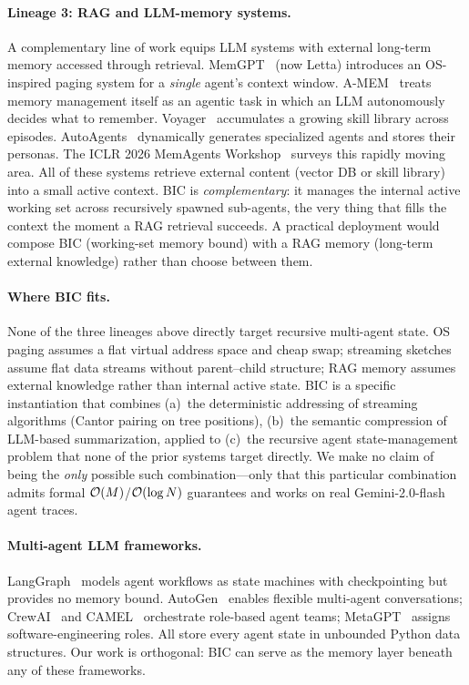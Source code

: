 \paragraph{Lineage 3: RAG and LLM-memory systems.}
A complementary line of work equips LLM systems with external
long-term memory accessed through retrieval.
MemGPT~\citep{packer2023memgpt} (now Letta) introduces an
OS-inspired paging system for a \emph{single} agent's context window.
A-MEM~\citep{amem2025} treats memory management itself as an agentic
task in which an LLM autonomously decides what to remember.
Voyager~\citep{wang2024voyager} accumulates a growing skill library
across episodes.  AutoAgents~\citep{wang2024autoagents} dynamically
generates specialized agents and stores their personas.  The ICLR
2026 MemAgents Workshop~\citep{memagents2026} surveys this rapidly
moving area.  All of these systems retrieve external content (vector
DB or skill library) into a small active context.  BIC is
\emph{complementary}: it manages the internal active working set
across recursively spawned sub-agents, the very thing that fills the
context the moment a RAG retrieval succeeds.  A practical deployment
would compose BIC (working-set memory bound) with a RAG memory
(long-term external knowledge) rather than choose between them.

\paragraph{Where BIC fits.}
None of the three lineages above directly target recursive multi-agent
state.  OS paging assumes a flat virtual address space and cheap
swap; streaming sketches assume flat data streams without
parent--child structure; RAG memory assumes external knowledge rather
than internal active state.  BIC is a specific instantiation that
combines (a)~the deterministic addressing of streaming algorithms
(Cantor pairing on tree positions), (b)~the semantic compression of
LLM-based summarization, applied to (c)~the recursive agent
state-management problem that none of the prior systems target
directly.  We make no claim of being the \emph{only} possible such
combination---only that this particular combination admits formal
$\mathcal{O}(M)$/$\mathcal{O}(\log N)$ guarantees and works on real Gemini-2.0-flash
agent traces.

\paragraph{Multi-agent LLM frameworks.}
LangGraph~\citep{langgraph2024} models agent workflows as state
machines with checkpointing but provides no memory bound.
AutoGen~\citep{wu2023autogen} enables flexible multi-agent
conversations; CrewAI~\citep{crewai2024} and
CAMEL~\citep{li2023camel} orchestrate role-based agent teams;
MetaGPT~\citep{hong2023metagpt} assigns software-engineering roles.
All store every agent state in unbounded Python data structures.
Our work is orthogonal: BIC can serve as the memory layer beneath any
of these frameworks.

